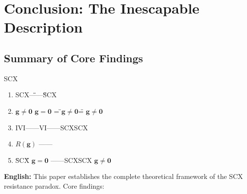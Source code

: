 \documentclass[12pt,a4paper]{article}
\theoremstyle{remark}
\newcommand{\g}{\mathbf{g}}
\begin{document}
\section{}
\section{Conclusion: The Inescapable Description}

\subsection{}
\subsection{Summary of Core Findings}

\noindent
\textbf{} SCX

\begin{enumerate}[label=(\arabic*)]
    \item \textbf{} SCX\"\"——\textbf{}\"\"SCX
    
    \item \textbf{}  $ \g \neq \mathbf{0} $  $ \g = \mathbf{0} $ =  \"$ \g \neq \mathbf{0} $\" =  $ \g \neq \mathbf{0} $
    
    \item \textbf{} IVI——VI——SCXSCX
    
    \item \textbf{}  $ R(\g) $ ——
    
    \item \textbf{} \"SCX\" $ \g = \mathbf{0} $ ——SCXSCX $ \g \neq \mathbf{0} $
\end{enumerate}

\vspace{6pt}
\noindent
\textbf{English:} This paper establishes the complete theoretical framework of the SCX resistance paradox. Core findings:
\end{document}
